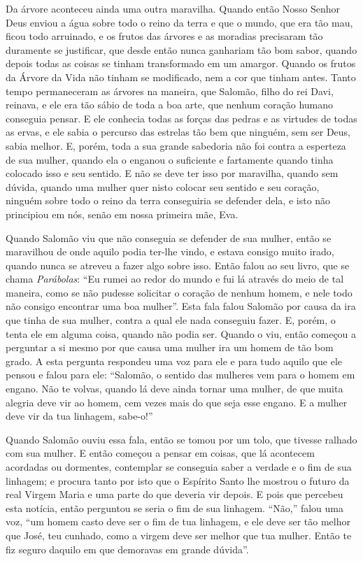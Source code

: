 Da árvore aconteceu ainda uma outra maravilha. Quando então Nosso Senhor Deus
enviou a água sobre todo o reino da terra e que o mundo, que era tão mau, ficou
todo arruinado, e os frutos das árvores e as moradias precisaram tão duramente
se justificar, que desde então nunca ganhariam tão bom sabor, quando depois
todas as coisas se tinham transformado em um amargor. Quando os frutos da
Árvore da Vida não tinham se modificado, nem a cor que tinham antes. Tanto
tempo permaneceram as árvores na maneira, que Salomão, filho do rei Davi,
reinava, e ele era tão sábio de toda a boa arte, que nenhum coração humano
conseguia pensar. E ele conhecia todas as forças das pedras e as virtudes de
todas as ervas, e ele sabia o percurso das estrelas tão bem que ninguém, sem
ser Deus, sabia melhor. E, porém, toda a sua grande sabedoria não foi contra a
esperteza de sua mulher, quando ela o enganou o suficiente e fartamente quando
tinha colocado isso e seu sentido. E não se deve ter isso por maravilha, quando
sem dúvida, quando uma mulher quer nisto colocar seu sentido e seu coração,
ninguém sobre todo o reino da terra conseguiria se defender dela, e isto não
principiou em nós, senão em nossa primeira mãe, Eva. 

Quando Salomão viu que não conseguia se defender de sua mulher, então se
maravilhou de onde aquilo podia ter-lhe vindo, e estava consigo muito irado,
quando nunca se atreveu a fazer algo sobre isso. Então falou ao seu livro, que
se chama \textit{Parábolas}: “Eu rumei ao redor do mundo e fui lá através do
meio de tal maneira, como se não pudesse solicitar o coração de nenhum homem, e
nele todo não consigo encontrar uma boa mulher”. Esta fala falou Salomão por
causa da ira que tinha de sua mulher, contra a qual ele nada conseguiu fazer.
E, porém, o tenta ele em alguma coisa, quando não podia ser. Quando o viu,
então começou a perguntar a si mesmo por que causa uma mulher ira um homem de
tão bom grado. A esta pergunta respondeu uma voz para ele e para tudo aquilo
que ele pensou e falou para ele: “Salomão, o sentido das mulheres vem para o
homem em engano. Não te volvas, quando lá deve ainda tornar uma mulher, de que
muita alegria deve vir ao homem, cem vezes mais do que seja esse engano. E a
mulher deve vir da tua linhagem, sabe-o!” 

Quando Salomão ouviu essa fala, então se tomou por um tolo, que tivesse ralhado
com sua mulher. E então começou a pensar em coisas, que lá acontecem acordadas
ou dormentes, contemplar se conseguia saber a verdade e o fim de sua linhagem;
e procura tanto por isto que o Espírito Santo lhe mostrou o futuro da real
Virgem Maria e uma parte do que deveria vir depois. E pois que percebeu esta
notícia, então perguntou se seria o fim de sua linhagem. “Não,” falou uma voz,
“um homem casto deve ser o fim de tua linhagem, e ele deve ser tão melhor que
José, teu cunhado, como a virgem deve ser melhor que tua mulher. Então te fiz
seguro daquilo em que demoravas em grande dúvida”. 

